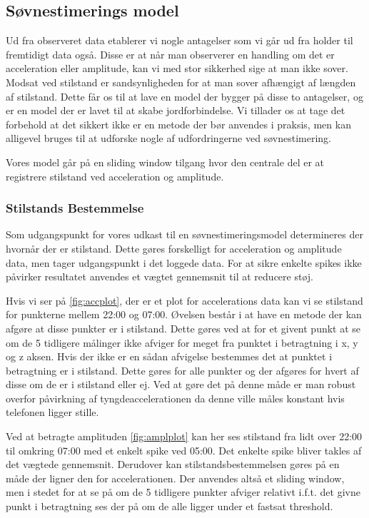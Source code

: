 \subsection{Søvnestimerings model}
Ud fra observeret data etablerer vi nogle antagelser som vi går ud fra holder til fremtidigt data også.
Disse er at når man observerer en handling om det er acceleration eller amplitude, kan vi med stor sikkerhed sige at man ikke sover.
Modsat ved stilstand er sandsynligheden for at man sover afhængigt af længden af stilstand.
Dette får os til at lave en model der bygger på disse to antagelser, og er en model der er lavet til at skabe jordforbindelse.
Vi tillader os at tage det forbehold at det sikkert ikke er en metode der bør anvendes i praksis, men kan alligevel bruges til at udforske nogle af udfordringerne ved søvnestimering.

Vores model går på en sliding window tilgang hvor den centrale del er at registrere stilstand ved acceleration og amplitude.
\subsubsection{Stilstands Bestemmelse}
Som udgangspunkt for vores udkast til en søvnestimeringsmodel determineres der hvornår der er stilstand.
Dette gøres forskelligt for acceleration og amplitude data, men tager udgangspunkt i det loggede data.
For at sikre enkelte spikes ikke påvirker resultatet anvendes et vægtet gennemsnit til at reducere støj.

Hvis vi ser på \cref{fig:accplot}, der er et plot for accelerations data kan vi se stilstand for punkterne mellem 22:00 og 07:00.
Øvelsen består i at have en metode der kan afgøre at disse punkter er i stilstand.
Dette gøres ved at for et givent punkt at se om de 5 tidligere målinger ikke afviger for meget fra punktet i betragtning i x, y og z aksen.
Hvis der ikke er en sådan afvigelse bestemmes det at punktet i betragtning er i stilstand.
Dette gøres for alle punkter og der afgøres for hvert af disse om de er i stilstand eller ej.
Ved at gøre det på denne måde er man robust overfor påvirkning af tyngdeaccelerationen da denne ville måles konstant hvis telefonen ligger stille.

Ved at betragte amplituden \cref{fig:amplplot} kan her ses stilstand fra lidt over 22:00 til omkring 07:00 med et enkelt spike ved 05:00.
Det enkelte spike bliver takles af det vægtede gennemsnit.
Derudover kan stilstandsbestemmelsen gøres på en måde der ligner den for accelerationen.
Der anvendes altså et sliding window, men i stedet for at se på om de 5 tidligere punkter afviger relativt i.f.t. det givne punkt i betragtning ses der på om de alle ligger under et fastsat threshold.

